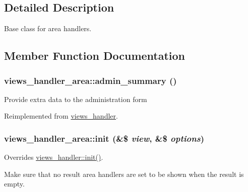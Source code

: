 \subsection{Detailed Description}
Base class for area handlers. 

\subsection{Member Function Documentation}
\hypertarget{classviews__handler__area_a859db27dfc7636cba49b95c2c8920e19}{
\subsubsection[{admin\_\-summary}]{\setlength{\rightskip}{0pt plus 5cm}views\_\-handler\_\-area::admin\_\-summary ()}}
\label{classviews__handler__area_a859db27dfc7636cba49b95c2c8920e19}
Provide extra data to the administration form 

Reimplemented from \hyperlink{classviews__handler_a27a5cb35f3f17322957730a95b6be11e}{views\_\-handler}.\hypertarget{classviews__handler__area_ad3af1ecd94f27a685d79125bd1bae4cb}{
\subsubsection[{init}]{\setlength{\rightskip}{0pt plus 5cm}views\_\-handler\_\-area::init (\&\$ {\em view}, \/  \&\$ {\em options})}}
\label{classviews__handler__area_ad3af1ecd94f27a685d79125bd1bae4cb}
Overrides \hyperlink{classviews__handler_aa7df174ffa94ab095f7b9fdf154bcc30}{views\_\-handler::init()}.

Make sure that no result area handlers are set to be shown when the result is empty. 

